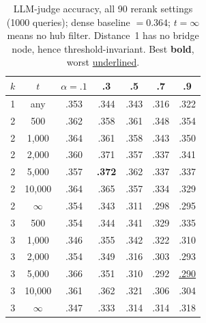 \documentclass{article}
\begin{document}
\begin{table}[h!]
\caption{LLM-judge accuracy, all 90 rerank settings (1000 queries); dense baseline $=0.364$; $t{=}\infty$ means no hub filter. Distance~1 has no bridge node, hence threshold-invariant. Best \textbf{bold}, worst \underline{underlined}.}
\label{tab:results}
\begin{center}
\begin{small}
\setlength{\tabcolsep}{4pt}
\begin{tabular}{cc | ccccc}
\toprule
$k$ & $t$ & $\alpha{=}.1$ & .3 & .5 & .7 & .9\\
\midrule
1 & any & .353 & .344 & .343 & .316 & .322\\
2 & 500 & .362 & .358 & .361 & .348 & .354\\
2 & 1{,}000 & .364 & .361 & .358 & .343 & .350\\
2 & 2{,}000 & .360 & .371 & .357 & .337 & .341\\
2 & 5{,}000 & .357 & \textbf{.372} & .362 & .337 & .337\\
2 & 10{,}000 & .364 & .365 & .357 & .334 & .329\\
2 & $\infty$ & .354 & .343 & .311 & .298 & .295\\
3 & 500 & .354 & .344 & .341 & .329 & .335\\
3 & 1{,}000 & .346 & .355 & .342 & .322 & .310\\
3 & 2{,}000 & .354 & .349 & .316 & .303 & .293\\
3 & 5{,}000 & .366 & .351 & .310 & .292 & \underline{.290}\\
3 & 10{,}000 & .361 & .362 & .321 & .306 & .304\\
3 & $\infty$ & .347 & .333 & .314 & .314 & .318\\
\bottomrule
\end{tabular}
\end{small}
\end{center}
\end{table}
\end{document}
